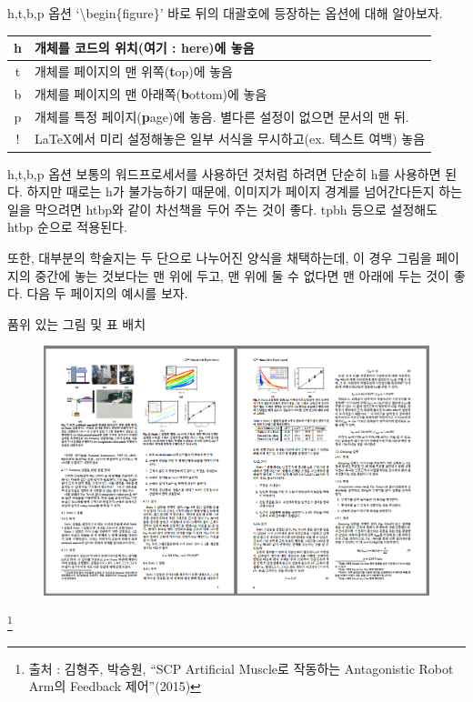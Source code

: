 \documentclass[12pt]{beamer}
\begin{document}
\begin{frame}{h,t,b,p 옵션}
	`\textbackslash begin\{figure\}' 바로 뒤의 대괄호에 등장하는 옵션에 대해 알아보자.
	\begin{table}
		\centering
		\begin{tabular}{|c|p{}|}
			\hline
			h & 개체를 코드의 위치(여기 : \textbf{h}ere)에 놓음 \\
			\hline
			t & 개체를 페이지의 맨 위쪽(\textbf{t}op)에 놓음 \\
			\hline
			b & 개체를 페이지의 맨 아래쪽(\textbf{b}ottom)에 놓음 \\
			\hline
			p & 개체를 특정 페이지(\textbf{p}age)에 놓음. 별다른 설정이 없으면 문서의 맨 뒤. \\
			\hline
			! & \LaTeX 에서 미리 설정해놓은 일부 서식을 무시하고(ex. 텍스트 여백) 놓음\\
			\hline
		\end{tabular}
	\end{table}
\end{frame}
\begin{frame}{h,t,b,p 옵션}
	보통의 워드프로세서를 사용하던 것처럼 하려면 단순히 h를 사용하면 된다. 하지만 때로는 h가 불가능하기 때문에, 이미지가 페이지 경계를 넘어간다든지 하는 일을 막으려면 htbp와 같이 차선책을 두어 주는 것이 좋다. tpbh 등으로 설정해도 htbp 순으로 적용된다.
	
	또한, 대부분의 학술지는 두 단으로 나누어진 양식을 채택하는데, 이 경우 그림을 페이지의 중간에 놓는 것보다는 맨 위에 두고, 맨 위에 둘 수 없다면 맨 아래에 두는 것이 좋다. 다음 두 페이지의 예시를 보자.
\end{frame}
\begin{frame}{품위 있는 그림 및 표 배치}
	\begin{figure}[h]
		\centering
		\includegraphics[width=.9\textwidth]{right_fig.png}
	\end{figure}
	\footnote{출처 : 김형주, 박승원, ``SCP Artificial Muscle로 작동하는 Antagonistic Robot Arm의 Feedback 제어''(2015)}
\end{frame}
\end{document}
